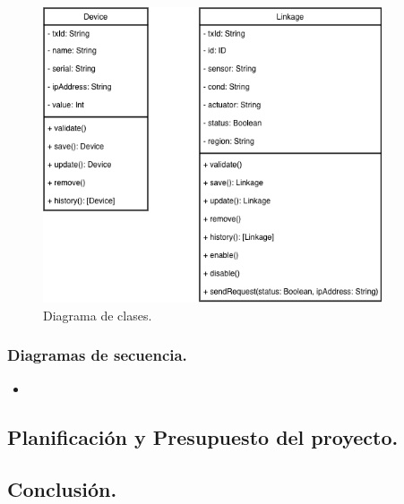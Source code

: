 \begin{figure}[h!]
    \centering
    \includegraphics[width=10cm]{imagenes/diagramas/diagrama_clases}
    \caption{Diagrama de clases.}
    \label{fig:diagrama-de-clases}
\end{figure}

\subsubsection{Diagramas de secuencia.}

\begin{itemize}
  \item
\end{itemize}

\subsection{Planificación y Presupuesto del proyecto.}

\subsection{Conclusión.}

\newpage
